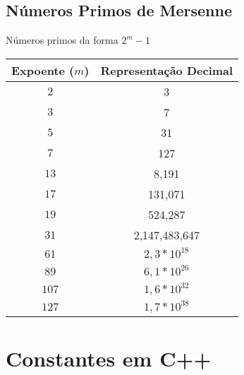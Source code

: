 \documentclass[10pt, a4paper, oneside]{book}
\begin{document}
\subsection{Números Primos de Mersenne}
\large{Números primos da forma $2^m-1$}
\begin{table}[h]
  \centering
  \begin{tabular}{|c|c|}
    \hline
    \textbf{Expoente ($m$)} & \textbf{Representação Decimal} \\
    \hline
    \(2\) & 3 \\
    \hline
    \(3\) & 7 \\
    \hline
    \(5\) & 31 \\
    \hline
    \(7\) & 127 \\
    \hline
    \(13\) & 8,191 \\
    \hline
    \(17\) & 131,071 \\
    \hline
    \(19\) & 524,287 \\
    \hline
    \(31\) & 2,147,483,647 \\
    \hline
    \(61\) & $2,3 * 10^{18}$ \\
    \hline
    \(89\) & $6,1 * 10^{26}$ \\
    \hline
    \(107\) & $1,6 * 10^{32}$ \\
    \hline
    \(127\) & $1,7 * 10^{38}$ \\
    \hline
  \end{tabular}
\end{table}

\section{Constantes em C++}
\end{document}
